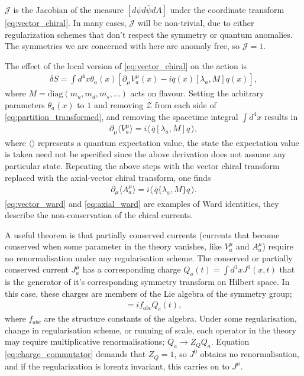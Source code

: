 $\mathcal{J}$ is the Jacobian of the measure $[d\psi d\bar{\psi} dA]$ under the coordinate transform \eqref{eq:vector_chiral}. In many cases, $\mathcal{J}$ will be non-trivial, due to either regularization schemes that don't respect the symmetry or quantum anomalies. The symmetries we are concerned with here are anomaly free, so $\mathcal{J}=1$.

The effect of the local version of \eqref{eq:vector_chiral} on the action is
\begin{align}
  \delta S = \int d^4x \theta_a(x) \left[ \partial_{\mu} V_a^{\mu}(x) - i\bar{q}(x) [\lambda_a,M] q(x) \right],
\end{align}
where $M = \text{diag}(m_u,m_d,m_s,...)$ acts on flavour. Setting the arbitrary parameters $\theta_a(x)$ to $1$ and removing $\mathcal{Z}$ from each side of \eqref{eq:partition_transformed}, and removing the spacetime integral $\int d^4x$ results in
\begin{align}
  \partial_{\mu}\langle V_a^{\mu} \rangle = i \langle \, \bar{q} [ \lambda_a, M ] q \, \rangle,
  \label{eq:vector_ward}
\end{align}
where $\langle \rangle$ represents a quantum expectation value, the state the expectation value is taken need not be specified since the above derivation does not assume any particular state. Repeating the above steps with the vector chiral transform replaced with the axial-vector chiral transform, one finds
\begin{align}
  \partial_{\mu}\langle A_a^{\mu} \rangle = i \langle\, \bar{q} \{ \lambda_a,M \} q \,\rangle.
  \label{eq:axial_ward}
\end{align}
\eqref{eq:vector_ward} and \eqref{eq:axial_ward} are examples of Ward identities, they describe the non-conservation of the chiral currents.

A useful theorem \cite{Fubini:1964boa} is that partially conserved currents (currents that become conserved when some parameter in the theory vanishes, like $V^{\mu}_a$ and $A^{\mu}_a$) require no renormalisation under any regularisation scheme. %
The conserved or partially conserved current $J_a^{\mu}$ has a corresponding charge $Q_a(t) = \int d^3x J^{0}(\underline{x},t)$ that is the generator of it's corresponding symmetry transform on Hilbert space. In this case, these charges are members of the Lie algebra of the symmetry group;
\begin{align}
  [ Q_a(t), Q_b(t) ] = if_{abc} Q_c(t),
  \label{eq:charge_commutator}
\end{align}
where $f_{abc}$ are the structure constants of the algebra. Under some regularisation, change in regularisation scheme, or running of scale, each operator in the theory may require multiplicative renormalisations; $Q_a \to Z_Q Q_a$. Equation \eqref{eq:charge_commutator} demands that $Z_Q=1$, so $J^0$ obtains no renormalisation, and if the regularization is lorentz invariant, this carries on to $J^{\mu}$.

